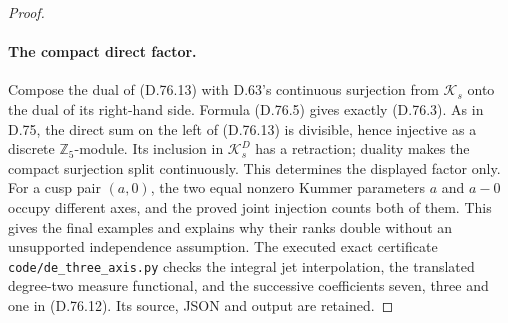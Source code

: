 \begin{proof}
\paragraph{The compact direct factor.}
Compose the dual of (D.76.13) with D.63's continuous
surjection from \(\mathcal K_s\) onto the dual of its
right-hand side. Formula (D.76.5) gives exactly (D.76.3).
As in D.75, the direct sum on the left of (D.76.13) is
divisible, hence injective as a discrete \(\mathbb Z_5\)-module.
Its inclusion in \(\mathcal K_s^D\) has a retraction;
duality makes the compact surjection split continuously.
This determines the displayed factor only.
For a cusp pair \((a,0)\), the two equal nonzero Kummer
parameters \(a\) and \(a-0\) occupy different axes, and
the proved joint injection counts both of them.
This gives the final examples and explains why their ranks
double without an unsupported independence assumption.
The executed exact certificate \texttt{code/de\_three\_axis.py}
checks the integral jet interpolation, the translated degree-two
measure functional, and the successive coefficients seven, three
and one in (D.76.12). Its source, JSON and output are retained.
\end{proof}
